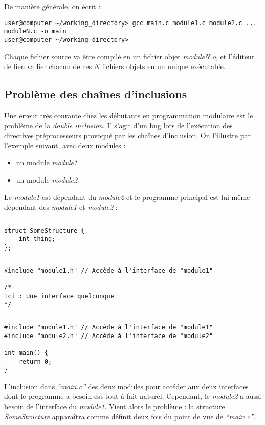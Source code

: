 \documentclass[../../../main.tex]{subfiles}
\begin{document}
De manière générale, on écrit :
\begin{verbatim}
user@computer ~/working_directory> gcc main.c module1.c module2.c ... moduleN.c -o main
user@computer ~/working_directory>
\end{verbatim}
Chaque fichier source va être compilé en un fichier objet \textit{moduleN.o}, et l'éditeur de lien va lier chacun de ces $N$ fichiers objets en un unique exécutable. 
\subsection{Problème des chaînes d'inclusions}
\label{sub:probl_me_des_cha_nes_d_inclusions}
Une erreur très courante chez les débutants en programmation modulaire est le problème de la \textit{double inclusion}. Il s'agit d'un bug lors de l'exécution des directives préprocesseurs provoqué par les chaînes d'inclusion. On l'illustre par l'exemple suivant, avec deux modules :
\begin{itemize}
	\item un module \textit{module1}
	\item un module \textit{module2}
\end{itemize}
Le \textit{module1} est dépendant du \textit{module2} et le programme principal est lui-même dépendant des \textit{module1} et \textit{module2} :
\begin{lstlisting}[title=module1.h]
\end{lstlisting}
\begin{verbatim}
struct SomeStructure {
	int thing;
};
\end{verbatim}
\begin{lstlisting}[title=module2.h]
\end{lstlisting}
\begin{verbatim}
#include "module1.h" // Accède à l'interface de "module1"

/*
Ici : Une interface quelconque
*/
\end{verbatim}
\begin{lstlisting}[title=main.c]
\end{lstlisting}
\begin{verbatim}
#include "module1.h" // Accède à l'interface de "module1"
#include "module2.h" // Accède à l'interface de "module2"

int main() {
	return 0;
}
\end{verbatim}
L'inclusion dans \textit{``main.c''} des deux modules pour accéder aux deux interfaces dont le programme a besoin est tout à fait naturel. Cependant, le \textit{module2} a aussi besoin de l'interface du \textit{module1}. Vient alors le problème : la structure \textit{SomeStructure} apparaîtra comme définit deux fois du point de vue de \textit{``main.c''}.
 
\end{document}

